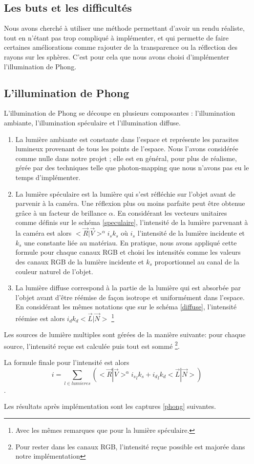 \subsection{Les buts et les difficultés}
Nous avons cherché à utiliser une méthode permettant d'avoir un rendu réaliste, tout en n'étant pas trop compliqué à implémenter, et qui permette de faire certaines améliorations comme rajouter de la transparence ou la réflection des rayons sur les sphères. C'est pour cela que nous avons choisi d'implémenter l'illumination de Phong.

\subsection{L'illumination de Phong}

L'illumination de Phong se découpe en plusieurs composantes : l'illumination ambiante, l'illumination spéculaire et l'illumination diffuse.
\begin{enumerate}
\item La lumière ambiante est constante dans l'espace et représente les parasites lumineux provenant de tous les points de l'espace. Nous l'avons considérée comme nulle dans notre projet ; elle est en général, pour plus de réalisme, gérée par des techniques telle que photon-mapping que nous n'avons pas eu le temps d'implémenter.
\item La lumière spéculaire est la lumière qui s'est réfléchie sur l'objet avant de parvenir à la caméra. Une réflexion plus ou moins parfaite peut être obtenue grâce à un facteur de brillance $\alpha$. En considérant les vecteurs unitaires comme définis sur le schéma \ref{speculaire}, l'intensité de la lumière parvenant à la caméra est alors $<\vec{R}|\vec{V}>^{\alpha} i_{s} k_{s}$ où $i_{s}$ l'intensité de la lumière incidente et $k_{s}$ une constante liée au matériau. En pratique, nous avons appliqué cette formule pour chaque canaux RGB et choisi les intensités comme les valeurs des canaux RGB de la lumière incidente et $k_{s}$ proportionnel au canal de la couleur naturel de l'objet.
\item La lumière diffuse correspond à la partie de la lumière qui est absorbée par l'objet avant d'être réémise de façon isotrope et uniformément dans l'espace. En considérant les mêmes notations que sur le schéma \ref{diffuse}, l'intensité réémise est alors $i_{d}k_{d}<\vec{L}|\vec{N}>$ \footnote{Avec les mêmes remarques que pour la lumière spéculaire.}
\end{enumerate}

Les sources de lumière multiples sont gérées de la manière suivante: pour chaque source, l'intensité reçue est calculée puis tout est sommé \footnote{Pour rester dans les canaux RGB, l'intensité reçue possible est majorée dans notre implémentation}.

La formule finale pour l'intensité est alors $$i = \sum_{l \in lumieres}(<\vec{R}|\vec{V}>^{\alpha} {i_{s}}_{l} k_{s} + {i_{d}}_{l}k_{d}<\vec{L}|\vec{N}>)$$.

Les résultats après implémentation sont les captures \ref{phong} suivantes.
